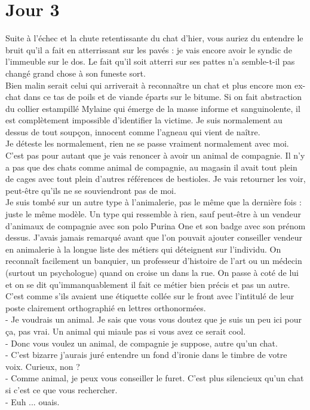 \chapter*{Jour 3}
Suite à l'échec et la chute retentissante du chat d'hier, vous auriez du entendre le bruit qu'il a fait en atterrissant sur les pavés : je vais encore avoir le syndic de l'immeuble sur le dos. Le fait qu'il soit atterri sur ses pattes n'a semble-t-il pas changé grand chose à son funeste sort. \\
Bien malin serait celui qui arriverait à reconnaître un chat et plus encore mon ex-chat dans ce tas de poils et de viande éparts sur le bitume. Si on fait abstraction du collier estampillé Mylaine qui émerge de la masse informe et sanguinolente, il est complètement impossible d'identifier la victime. Je suis normalement au dessus de tout soupçon, innocent comme l'agneau qui vient de naître.\\

Je déteste les normalement, rien ne se passe vraiment normalement avec moi.\\

C'est pas pour autant que je vais renoncer à avoir un animal de compagnie. Il n'y a pas que des chats comme animal de compagnie, au magasin il avait tout plein de cages avec tout plein d'autres références de bestioles. Je vais retourner les voir, peut-être qu'ils ne se souviendront pas de moi. \\

Je suis tombé sur un autre type à l'animalerie, pas le même que la dernière fois : juste le même modèle. Un type qui ressemble à rien, sauf peut-être à un vendeur d'animaux de compagnie avec son polo Purina One et son badge avec son prénom dessus. J'avais jamais remarqué avant que l'on pouvait ajouter conseiller vendeur en animalerie à la longue liste des métiers qui déteignent sur l'individu. On reconnaît facilement un banquier, un professeur d'histoire de l'art ou un médecin (surtout un psychologue) quand on croise un dans la rue. On passe à coté de lui et on se dit qu'immanquablement il fait ce métier bien précis et pas un autre. C'est comme s'ils avaient une étiquette collée sur le front avec l’intitulé de leur poste clairement orthographié en lettres orthonormées. \\

- Je voudrais un animal. Je sais que vous vous doutez que je suis un peu ici pour ça, pas vrai. Un animal qui miaule pas si vous avez ce serait cool. \\
- Donc vous voulez un animal, de compagnie je suppose, autre qu'un chat. \\
- C'est bizarre j'aurais juré entendre un fond d'ironie dans le timbre de votre voix. Curieux, non ? \\
- Comme animal, je peux vous conseiller le furet. C'est plus silencieux qu'un chat si c'est ce que vous rechercher. \\
- Euh ... ouais.\\

